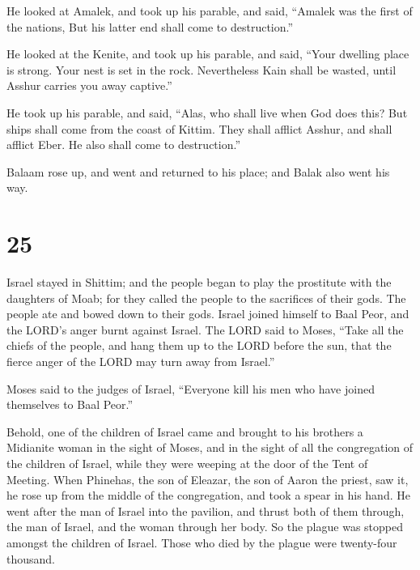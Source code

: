  He looked at Amalek, and took up his parable, and said,
``Amalek was the first of the nations, But his latter end shall come to
destruction.''

 He looked at the Kenite, and took up his parable, and
said, ``Your dwelling place is strong. Your nest is set in the rock.
 Nevertheless Kain shall be wasted, until Asshur carries
you away captive.''

 He took up his parable, and said, ``Alas, who shall live
when God does this?  But ships shall come from the coast
of Kittim. They shall afflict Asshur, and shall afflict Eber. He also
shall come to destruction.''

 Balaam rose up, and went and returned to his place; and
Balak also went his way.

\hypertarget{section-24}{%
\section{25}\label{section-24}}

 Israel stayed in Shittim; and the people began to play
the prostitute with the daughters of Moab;  for they
called the people to the sacrifices of their gods. The people ate and
bowed down to their gods.  Israel joined himself to Baal
Peor, and the LORD's anger burnt against Israel.  The LORD
said to Moses, ``Take all the chiefs of the people, and hang them up to
the LORD before the sun, that the fierce anger of the LORD may turn away
from Israel.''

 Moses said to the judges of Israel, ``Everyone kill his
men who have joined themselves to Baal Peor.''

 Behold, one of the children of Israel came and brought to
his brothers a Midianite woman in the sight of Moses, and in the sight
of all the congregation of the children of Israel, while they were
weeping at the door of the Tent of Meeting.  When
Phinehas, the son of Eleazar, the son of Aaron the priest, saw it, he
rose up from the middle of the congregation, and took a spear in his
hand.  He went after the man of Israel into the pavilion,
and thrust both of them through, the man of Israel, and the woman
through her body. So the plague was stopped amongst the children of
Israel.  Those who died by the plague were twenty-four
thousand.

